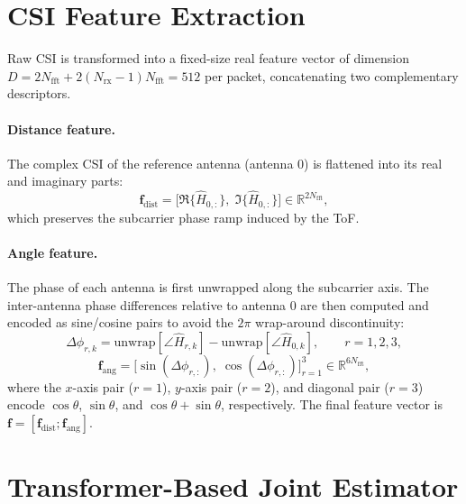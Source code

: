 \documentclass[conference]{IEEEtran}
\begin{document}
\section{CSI Feature Extraction}
\label{sec:features}

Raw CSI is transformed into a fixed-size real feature vector of dimension
$D = 2N_{\mathrm{fft}} + 2(N_{\mathrm{rx}}-1)N_{\mathrm{fft}} = 512$ per packet,
concatenating two complementary descriptors.

\paragraph{Distance feature.}
The complex CSI of the reference antenna (antenna 0) is flattened into its real
and imaginary parts:
\begin{equation}
  \mathbf{f}_{\mathrm{dist}} =
  \big[\Re\{\hat{H}_{0,:}\},\; \Im\{\hat{H}_{0,:}\}\big] \in \mathbb{R}^{2N_{\mathrm{fft}}},
\label{eq:distfeat}
\end{equation}
which preserves the subcarrier phase ramp induced by the ToF.

\paragraph{Angle feature.}
The phase of each antenna is first unwrapped along the subcarrier axis. The
inter-antenna phase differences relative to antenna 0 are then computed and
encoded as sine/cosine pairs to avoid the $2\pi$ wrap-around discontinuity:
\begin{equation}
  \Delta\phi_{r,k} = \mathrm{unwrap}\left[\angle\hat{H}_{r,k}\right]
                    - \mathrm{unwrap}\left[\angle\hat{H}_{0,k}\right],
  \qquad r=1,2,3,
\label{eq:phasediff}
\end{equation}
\begin{equation}
  \mathbf{f}_{\mathrm{ang}} = \big[\sin(\Delta\phi_{r,:}),\;
                              \cos(\Delta\phi_{r,:})\big]_{r=1}^{3}
                              \in \mathbb{R}^{6N_{\mathrm{fft}}},
\label{eq:angfeat}
\end{equation}
where the $x$-axis pair ($r=1$), $y$-axis pair ($r=2$), and diagonal pair
($r=3$) encode $\cos\theta$, $\sin\theta$, and $\cos\theta+\sin\theta$,
respectively. The final feature vector is
$\mathbf{f} = [\mathbf{f}_{\mathrm{dist}}; \mathbf{f}_{\mathrm{ang}}]$.

\section{Transformer-Based Joint Estimator}
\label{sec:transformer}
\end{document}
